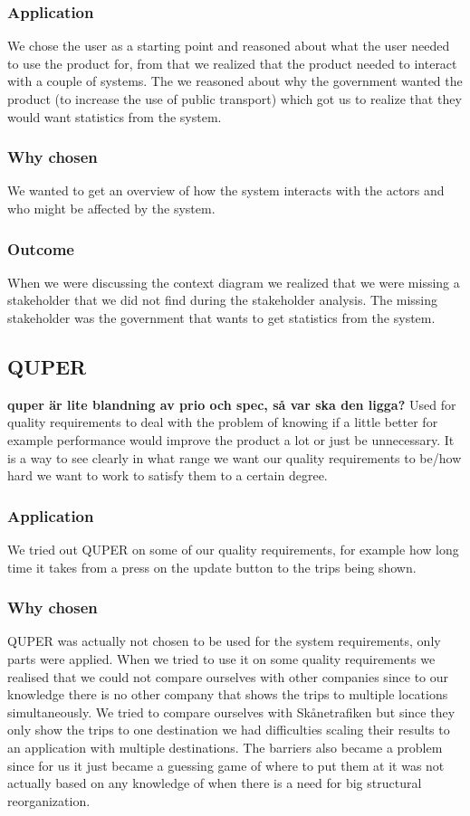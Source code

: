 \documentclass[a4paper]{article}
\begin{document}
    \subsubsection{Application}
    We chose the user as a starting point and reasoned about what the user needed to use the product for, from that we realized that the product needed to interact with a couple of systems. The we reasoned about why the government wanted the product (to increase the use of public transport) which got us to realize that they would want statistics from the system.
    \subsubsection{Why chosen}
    We wanted to get an overview of how the system interacts with the actors and who might be affected by the system.
    \subsubsection{Outcome}
	When we were discussing the context diagram we realized that we were missing a stakeholder that we did not find during the stakeholder analysis. The missing stakeholder was the government that wants to get statistics from the system. 

	\subsection{QUPER}
		\textbf{quper är lite blandning av prio och spec, så var ska den ligga?}
		Used for quality requirements to deal with the problem of knowing if a little better for example performance would improve the product a lot or just be unnecessary. It is a way to see clearly in what range we want our quality requirements to be/how hard we want to work to satisfy them to a certain degree.
    	\subsubsection{Application}
    	We tried out QUPER on some of our quality requirements, for example how long time it takes from a press on the update button to the trips being shown.
    	\subsubsection{Why chosen}
    	QUPER was actually not chosen to be used for the system requirements, only parts were applied. When we tried to use it on some quality requirements we realised that we could not compare ourselves with other companies since to our knowledge there is no other company that shows the trips to multiple locations simultaneously. We tried to compare ourselves with Skånetrafiken but since they only show the trips to one destination we had difficulties scaling their results to an application with multiple destinations. The barriers also became a problem since for us it just became a guessing game of where to put them at it was not actually based on any knowledge of when there is a need for big structural reorganization. 
    	
\end{document}
